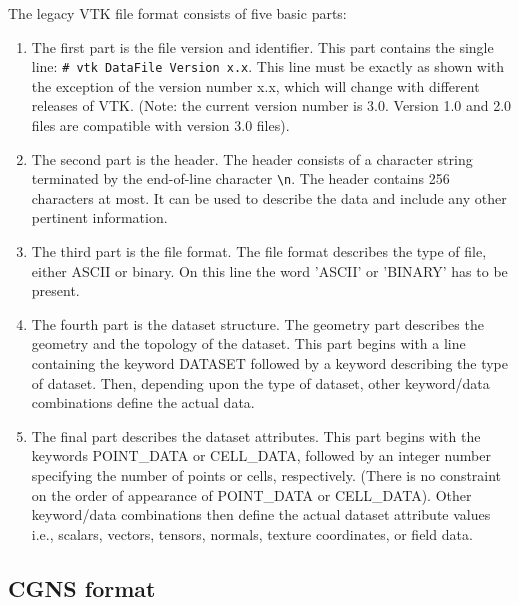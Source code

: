 The legacy VTK file format consists of five basic parts:

\begin{enumerate}
\setlength{\itemsep}{1pt}
\setlength{\parskip}{0pt}
\setlength{\parsep}{0pt}
\item The first part is the file version and identifier. This part contains the
single line: \verb+# vtk DataFile Version x.x+.  This line must be exactly as
shown with the exception of the version number x.x, which will change with
different releases of VTK. (Note: the current version number is 3.0. Version
1.0 and 2.0 files are compatible with version 3.0 files).
\item The second part is the header. The header consists of a character string
terminated by the end-of-line character \verb+\n+. The header contains 256
characters at most. It can be used to describe the data and include any other
pertinent information.
\item The third part is the file format. The file format describes the type of
file, either ASCII or binary.  On this line the word 'ASCII' or 'BINARY' has to
be present.
\item The fourth part is the dataset structure. The geometry part describes the
geometry and the topology of the dataset. This part begins with a line
containing the keyword DATASET followed by a keyword describing the type of
dataset.  Then, depending upon the type of dataset, other keyword/data
combinations define the actual data.
\item The final part describes the dataset attributes. This part begins with
the keywords POINT\_DATA or CELL\_DATA, followed by an integer number
specifying the number of points or cells, respectively. (There is no constraint
on the order of appearance of POINT\_DATA or CELL\_DATA). Other keyword/data
combinations then define the actual dataset attribute values i.e., scalars,
vectors, tensors, normals, texture coordinates, or field data.
\end{enumerate}

\subsection{CGNS format}

